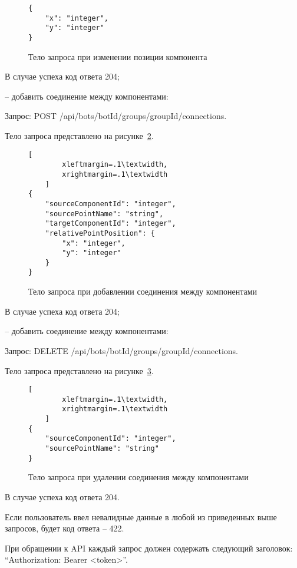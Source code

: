 \begin{figure}[ht]
	\centering
	\vspace{\toppaddingoffigure}
	\begin{lstlisting}
{
    "x": "integer",
    "y": "integer"
}
    \end{lstlisting}
	\caption{Тело запроса при изменении позиции компонента}
	\label{f:update-component-position}
\end{figure}

В случае успеха код ответа 204;

-- \hspace{\clabelsep} добавить соединение между компонентами:

Запрос: POST /api/bots/{botId}/groups/{groupId}/connections.

Тело запроса представлено на рисунке~\ref{f:add-connection}.

\begin{figure}[ht]
	\centering
	\vspace{\toppaddingoffigure}
	\begin{lstlisting}[
        xleftmargin=.1\textwidth,
        xrightmargin=.1\textwidth
    ]
{
    "sourceComponentId": "integer",
    "sourcePointName": "string",
    "targetComponentId": "integer",
    "relativePointPosition": {
        "x": "integer",
        "y": "integer"
    }
}
    \end{lstlisting}
	\caption{Тело запроса при добавлении соединения между компонентами}
	\label{f:add-connection}
\end{figure}

В случае успеха код ответа 204;

-- \hspace{\clabelsep} добавить соединение между компонентами:

Запрос: DELETE /api/bots/{botId}/groups/{groupId}/connections.

Тело запроса представлено на рисунке~\ref{f:delete-connection}.

\begin{figure}[ht]
	\centering
	\vspace{\toppaddingoffigure}
	\begin{lstlisting}[
        xleftmargin=.1\textwidth,
        xrightmargin=.1\textwidth
    ]
{
    "sourceComponentId": "integer",
    "sourcePointName": "string"
}
    \end{lstlisting}
	\caption{Тело запроса при удалении соединения между компонентами}
	\label{f:delete-connection}
\end{figure}

В случае успеха код ответа 204.


Если пользователь ввел невалидные данные в любой из приведенных
выше запросов, будет код ответа – 422.

При обращении к API каждый запрос должен содержать следующий
заголовок: “Authorization: Bearer <token>”.

